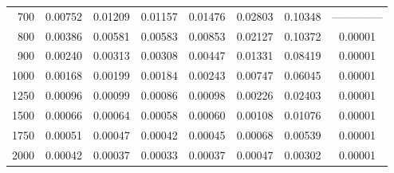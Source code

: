 \begin{table}[ht]
\begin{tabular}{r|c|c|c|c|c|c|c}
      700 & 0.00752 & 0.01209 & 0.01157 & 0.01476 & 0.02803 & 0.10348 & -------------- \\
      800 & 0.00386 & 0.00581 & 0.00583 & 0.00853 & 0.02127 & 0.10372 & 0.00001 \\
      900 & 0.00240 & 0.00313 & 0.00308 & 0.00447 & 0.01331 & 0.08419 & 0.00001 \\
     1000 & 0.00168 & 0.00199 & 0.00184 & 0.00243 & 0.00747 & 0.06045 & 0.00001 \\
     1250 & 0.00096 & 0.00099 & 0.00086 & 0.00098 & 0.00226 & 0.02403 & 0.00001 \\
     1500 & 0.00066 & 0.00064 & 0.00058 & 0.00060 & 0.00108 & 0.01076 & 0.00001 \\
     1750 & 0.00051 & 0.00047 & 0.00042 & 0.00045 & 0.00068 & 0.00539 & 0.00001 \\
     2000 & 0.00042 & 0.00037 & 0.00033 & 0.00037 & 0.00047 & 0.00302 & 0.00001 \\ \cline{1-8}
    \end{tabular}
    \label{tab:XRayEffODE4}
\end{table}
